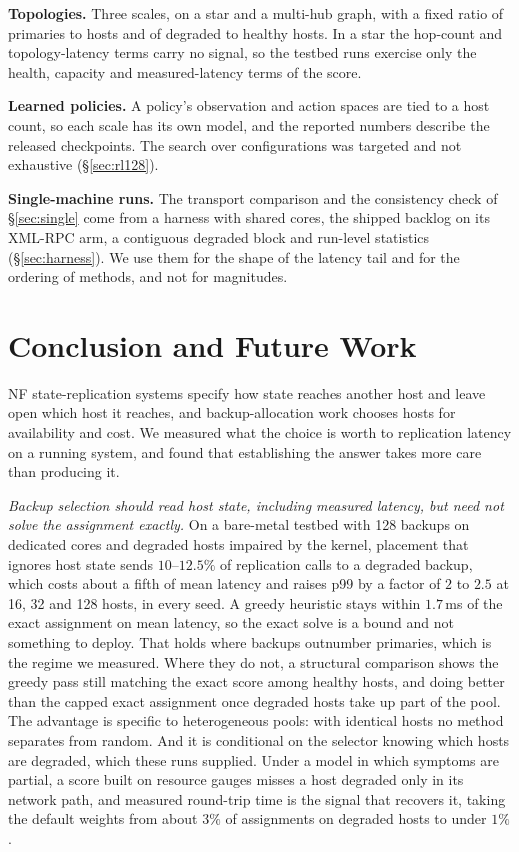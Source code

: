 \documentclass[journal]{IEEEtran}
\begin{document}
\textbf{Topologies.} Three scales, on a star and a multi-hub graph, with a
fixed ratio of primaries to hosts and of degraded to healthy hosts. In a star
the hop-count and topology-latency terms carry no signal, so the testbed runs
exercise only the health, capacity and measured-latency terms of the score.

\textbf{Learned policies.} A policy's observation and action spaces are tied to
a host count, so each scale has its own model, and the reported numbers
describe the released checkpoints. The search over configurations was targeted
and not exhaustive (\S\ref{sec:rl128}).

\textbf{Single-machine runs.} The transport comparison and the consistency
check of \S\ref{sec:single} come from a harness with shared cores, the shipped
backlog on its XML-RPC arm, a contiguous degraded block and run-level
statistics (\S\ref{sec:harness}). We use them for the shape of the latency tail
and for the ordering of methods, and not for magnitudes.

\section{Conclusion and Future Work}
\label{sec:conclusion}

NF state-replication systems specify how state reaches another host and leave
open which host it reaches, and backup-allocation work chooses hosts for
availability and cost. We measured what the choice is worth to replication
latency on a running system, and found that establishing the answer takes more
care than producing it.

\emph{Backup selection should read host state, including measured latency, but
need not solve the assignment exactly.} On a bare-metal testbed with 128 backups on dedicated
cores and degraded hosts impaired by the kernel, placement that ignores host
state sends $10$--$12.5\%$ of replication calls to a degraded backup, which
costs about a fifth of mean latency and raises p99 by a factor of $2$ to $2.5$
at 16, 32 and 128 hosts, in every seed. A greedy heuristic stays within
$1.7$\,ms of the exact assignment on mean latency, so the exact solve is a
bound and not something to deploy. That holds where backups outnumber
primaries, which is the regime we measured. Where they do not, a structural
comparison shows the greedy pass still matching the exact score among healthy
hosts, and doing better than the capped exact assignment once degraded hosts
take up part of the pool. The
advantage is specific to heterogeneous pools: with identical hosts no method
separates from random. And it is conditional on the selector knowing which
hosts are degraded, which these runs supplied. Under a model in which symptoms
are partial, a score built on resource gauges misses a host degraded only in
its network path, and measured round-trip time is the signal that recovers it,
taking the default weights from about $3\%$ of assignments on degraded hosts
to under $1\%$.
\end{document}
